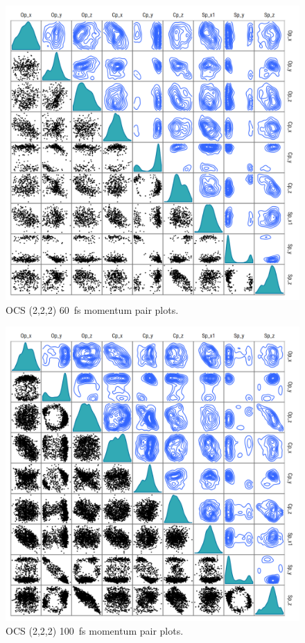\begin{figure}
  \centering
  \includegraphics[width=\textwidth]{Plots/OCS22260fsMomentumPairPlots.png}
  \caption[OCS (2,2,2) \SI{60}{\fs} momentum pair plots.]
  {OCS (2,2,2) \SI{60}{\fs} momentum pair plots.}
  \label{fig:OCS22260fsMomentumPairPlots}
\end{figure}

\begin{figure}
  \centering
  \includegraphics[width=\textwidth]{Plots/OCS222100fsMomentumPairPlots.png}
  \caption[OCS (2,2,2) \SI{100}{\fs} momentum pair plots.]
  {OCS (2,2,2) \SI{100}{\fs} momentum pair plots.}
  \label{fig:OCS222100fsMomentumPairPlots}
\end{figure}

